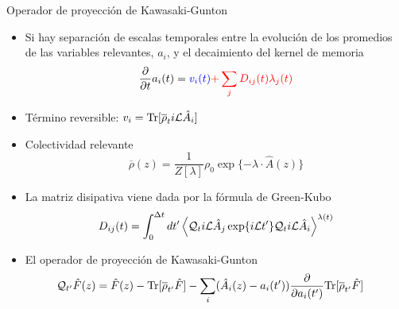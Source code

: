 \documentclass{beamer}
\begin{document}
\begin{frame}{Operador de proyección de Kawasaki-Gunton}
  \begin{itemize}
    \item<1-> Si hay separación de escalas temporales entre la evolución de los promedios de las variables relevantes, $a_i$, y el decaimiento del kernel de memoria 
\begin{equation}
  \frac{\partial}{\partial t}a_i(t) = {\color{blue} v_i(t)} {\color{red} +\sum_j D_{ij}(t) \lambda_j(t)}
\nonumber
\end{equation}
\item<2-> {\color{blue} Término reversible}: $v_i={\rm Tr}[\overline{\rho}_t i{\cal L}\hat{A}_i]$ 
\item<3-> Colectividad relevante 
  \begin{equation}
  \overline{\rho}(z) = \frac{1}{Z[\lambda]} \rho_0\exp\{-\lambda\!\cdot\!\hat{A}(z)\}
  \nonumber
  \end{equation}
\item<4-> {\color{red} La matriz disipativa} viene dada por la fórmula de  Green-Kubo
\begin{equation}
D_{ij}(t)=\int_0^{\Delta t} dt'\left\langle 
{\cal Q}_t i{\cal L}\hat{A}_j\exp\{i{\cal L}t'\}{\cal Q}_t i{\cal L}\hat{A}_i
\right\rangle^{\lambda(t)}
\label{dij}
\nonumber
\end{equation}
\item<5-> El operador de proyección de Kawasaki-Gunton  
  \begin{align}
    {\cal Q}_{t'}\hat{F}(z) &= \hat{F}(z)- {\rm Tr}[\overline{\rho}_{t'} \hat{F}]
  -\sum_i(\hat{A}_i(z)-a_i(t'))\frac{\partial }{\partial a_i(t')}
  {\rm Tr}[\overline{\rho}_{t'} \hat{F}]
  \label{Q}
  \nonumber
  \end{align}
\end{itemize}
\end{frame}
\end{document}
